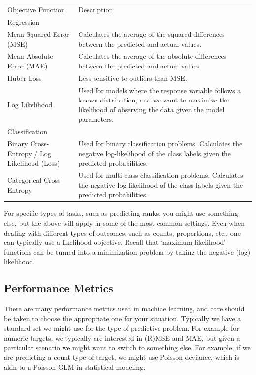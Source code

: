\documentclass[
  letterpaper,
]{krantz}
\begin{document}
\hypertarget{tbl-objective-functions}{}
\begin{longtable}{ll}
\caption{\label{tbl-objective-functions}Commonly used objective functions in machine learning for standard
regression and classification tasks. }\tabularnewline

\caption*{
{\large }
} \\ 
\toprule
Objective Function & Description \\ 
\midrule
\multicolumn{2}{l}{Regression} \\ 
\midrule
Mean Squared Error (MSE) & Calculates the average of the squared differences between the predicted and actual values. \\ 
Mean Absolute Error (MAE) & Calculates the average of the absolute differences between the predicted and actual values. \\ 
Huber Loss & Less sensitive to outliers than MSE. \\ 
Log Likelihood & Used for models where the response variable follows a known distribution, and we want to maximize the likelihood of observing the data given the model parameters. \\ 
\midrule
\multicolumn{2}{l}{Classification} \\ 
\midrule
Binary Cross-Entropy / Log Likelihood (Loss) & Used for binary classification problems. Calculates the negative log-likelihood of the class labels given the predicted probabilities. \\ 
Categorical Cross-Entropy & Used for multi-class classification problems. Calculates the negative log-likelihood of the class labels given the predicted probabilities. \\ 
\bottomrule
\end{longtable}

For specific types of tasks, such as predicting ranks, you might use
something else, but the above will apply in some of the most common
settings. Even when dealing with different types of outcomes, such as
counts, proportions, etc., one can typically use a likelihood objective.
Recall that `maximum likelihood' functions can be turned into a
minimization problem by taking the negative (log) likelihood.

\subsection{Performance Metrics}\label{performance-metrics}

There are many performance metrics used in machine learning, and care
should be taken to choose the appropriate one for your situation.
Typically we have a standard set we might use for the type of predictive
problem. For example for numeric targets, we typically are interested in
(R)MSE and MAE, but given a particular scenario we might want to switch
to something else. For example, if we are predicting a count type of
target, we might use Poisson deviance, which is akin to a Poisson GLM in
statistical modeling.
\end{document}
